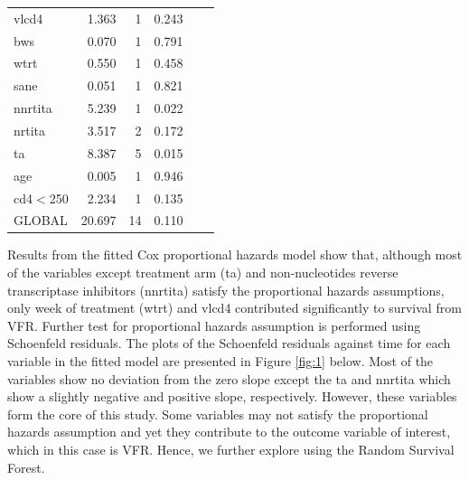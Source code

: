 \documentclass[10pt]{NSP1}
\begin{document}
\begin{table}[H]
\begin{tabular}{l r r r r r}
        vlcd4 & 1.363 & 1 & 0.243 & & \\
        bws & 0.070 & 1 & 0.791 & & \\
        wtrt & 0.550& 1 & 0.458 & & \\
        sane& 0.051 & 1 & 0.821 & & \\
        nnrtita & 5.239 & 1 & 0.022 & & \\
        nrtita & 3.517 & 2 & 0.172 & & \\
        ta& 8.387 & 5 & 0.015 & & \\
        age & 0.005 & 1 & 0.946 & & \\
        cd4$<$250 & 2.234 & 1 & 0.135 & & \\
        \midrule
        GLOBAL & 20.697 & 14 & 0.110 & & \\
        \bottomrule
    \end{tabular}
\end{table}

Results from the fitted Cox proportional hazards model show that, although most of the variables except treatment arm (ta) and non-nucleotides reverse transcriptase inhibitors (nnrtita) satisfy the proportional hazards assumptions, only week of treatment (wtrt) and vlcd4 contributed significantly to survival from VFR. Further test for proportional hazards assumption is performed using Schoenfeld residuals. The plots of the Schoenfeld residuals against time for each variable in the fitted model are presented in Figure \ref{fig:1} below. Most of the variables show no deviation from the zero slope except the ta and nnrtita which show a slightly negative and positive slope, respectively. However, these variables form the core of this study. Some variables may not satisfy the proportional hazards assumption and yet they contribute to the outcome variable of interest, which in this case is VFR. Hence, we further explore using the Random Survival Forest.

\end{document}
